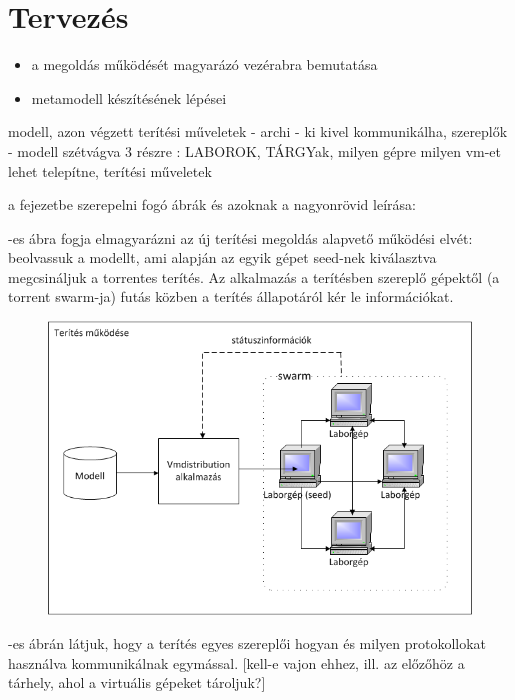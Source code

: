 \chapter{Tervezés}
\label{chp:design}
\begin{itemize}
  \item a megoldás működését magyarázó vezérabra bemutatása
  \item metamodell készítésének lépései
\end{itemize}

modell, azon végzett terítési műveletek
- archi - ki kivel kommunikálha, szereplők
- modell szétvágva 3 részre : LABOROK, TÁRGYak, milyen gépre milyen vm-et lehet telepítne, terítési műveletek

a fejezetbe szerepelni fogó ábrák és azoknak a nagyonrövid leírása:



-es ábra fogja elmagyarázni az új terítési megoldás alapvető működési elvét: beolvassuk a modellt, ami alapján az egyik gépet seed-nek kiválasztva megcsináljuk a torrentes terítés. Az alkalmazás a terítésben szereplő gépektől (a torrent swarm-ja) futás közben a terítés állapotáról kér le információkat.

\begin{figure}[ht]
	\centering
	\includegraphics[width=130mm, keepaspectratio]{figures/design_overview.png}
	\caption{}
	\label{fig:designoverview}
\end{figure}

-es ábrán látjuk, hogy a terítés egyes szereplői hogyan és milyen protokollokat használva kommunikálnak egymással. [kell-e vajon ehhez, ill. az előzőhöz a tárhely, ahol a virtuális gépeket tároljuk?]

